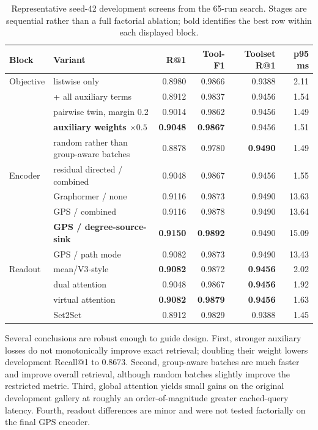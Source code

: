 \documentclass{article}
\makeatletter
\newcommand{\Rone}{R@1}
\newcommand{\toolF}{Tool-F1}
\makeatother
\begin{document}
\begin{table}[t]
\caption{Representative seed-42 development screens from the 65-run search.  Stages are sequential rather than a full factorial ablation; bold identifies the best row within each displayed block.}
\label{tab:ablations}
\centering
\scriptsize
\begin{tabular}{llrrrr}
\toprule
Block & Variant & \Rone{} & \toolF{} & Toolset R@1 & p95 ms \\
\midrule
Objective & listwise only & 0.8980 & 0.9866 & 0.9388 & 2.11 \\
& + all auxiliary terms & 0.8912 & 0.9837 & 0.9456 & 1.54 \\
& pairwise twin, margin 0.2 & 0.9014 & 0.9862 & 0.9456 & 1.49 \\
& \textbf{auxiliary weights $\times0.5$} & \textbf{0.9048} & \textbf{0.9867} & 0.9456 & 1.51 \\
& random rather than group-aware batches & 0.8878 & 0.9780 & \textbf{0.9490} & 1.49 \\
\midrule
Encoder & residual directed / combined & 0.9048 & 0.9867 & 0.9456 & 1.55 \\
& Graphormer / none & 0.9116 & 0.9873 & 0.9490 & 13.63 \\
& GPS / combined & 0.9116 & 0.9878 & 0.9490 & 13.64 \\
& \textbf{GPS / degree-source-sink} & \textbf{0.9150} & \textbf{0.9892} & 0.9490 & 15.09 \\
& GPS / path mode & 0.9082 & 0.9873 & 0.9490 & 13.43 \\
\midrule
Readout & mean/V3-style & \textbf{0.9082} & 0.9872 & \textbf{0.9456} & 2.02 \\
& dual attention & 0.9048 & 0.9867 & \textbf{0.9456} & 1.92 \\
& virtual attention & \textbf{0.9082} & \textbf{0.9879} & \textbf{0.9456} & 1.63 \\
& Set2Set & 0.8912 & 0.9829 & 0.9388 & 1.45 \\
\bottomrule
\end{tabular}
\end{table}

Several conclusions are robust enough to guide design.
First, stronger auxiliary losses do not monotonically improve exact retrieval; doubling their weight lowers development Recall@1 to 0.8673.
Second, group-aware batches are much faster and improve overall retrieval, although random batches slightly improve the restricted metric.
Third, global attention yields small gains on the original development gallery at roughly an order-of-magnitude greater cached-query latency.
Fourth, readout differences are minor and were not tested factorially on the final GPS encoder.
\end{document}

